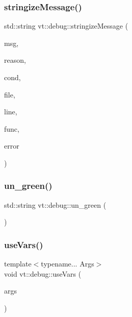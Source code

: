 \subsubsection{\texorpdfstring{stringize\+Message()}{stringizeMessage()}}
{\footnotesize\ttfamily std\+::string vt\+::debug\+::stringize\+Message (\begin{DoxyParamCaption}\item[{std\+::string const \&}]{msg,  }\item[{std\+::string const \&}]{reason,  }\item[{std\+::string const \&}]{cond,  }\item[{std\+::string const \&}]{file,  }\item[{int const}]{line,  }\item[{std\+::string const \&}]{func,  }\item[{\hyperlink{namespacevt_a793764d753923abc3d32929870beb485}{Error\+Code\+Type}}]{error }\end{DoxyParamCaption})}

\mbox{\label{namespacevt_1_1debug_aa449a2c29c030d8cd267fd19c0511d5c}} 
\subsubsection{\texorpdfstring{un\+\_\+green()}{un\_green()}}
{\footnotesize\ttfamily std\+::string vt\+::debug\+::un\+\_\+green (\begin{DoxyParamCaption}{ }\end{DoxyParamCaption})\hspace{0.3cm}{\ttfamily [inline]}}

\mbox{\label{namespacevt_1_1debug_aeff93f73b5ac173a53dcf778ff771c2e}} 
\subsubsection{\texorpdfstring{use\+Vars()}{useVars()}}
{\footnotesize\ttfamily template$<$typename... Args$>$ \\
void vt\+::debug\+::use\+Vars (\begin{DoxyParamCaption}\item[{Args \&\&...}]{args }\end{DoxyParamCaption})}

